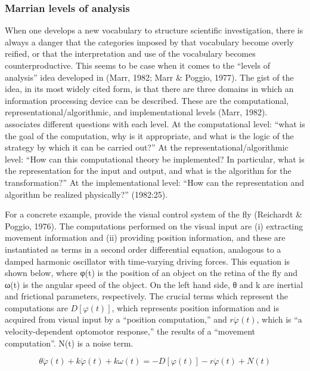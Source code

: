 \subsubsection{Marrian levels of analysis}

When one develops a new vocabulary to structure scientific investigation, there is always a danger that the categories imposed by that vocabulary become overly reified, or that the interpretation and use of the vocabulary becomes counterproductive. This seems to be case when it comes to the “levels of analysis” idea developed in (Marr, 1982; Marr \& Poggio, 1977). The gist of the idea, in its most widely cited form, is that there are three domains in which an information processing device can be described. These are the computational, representational/algorithmic, and implementational levels (Marr, 1982). \citet{Marr1982} associates different questions with each level. At the computational level: “what is the goal of the computation, why is it appropriate, and what is the logic of the strategy by which it can be carried out?” At the representational/algorithmic level: “How can this computational theory be implemented? In particular, what is the representation for the input and output, and what is the algorithm for the transformation?” At the implementational level: “How  can the representation and algorithm be realized physically?” (1982:25).

  For a concrete example, \citet{MarrPoggio1977} provide the visual control system of the fly (Reichardt \& Poggio, 1976). The computations performed on the visual input are (i) extracting movement information and (ii) providing position information, and these are instantiated as terms in a second order differential equation, analogous to a damped harmonic oscillator with time-varying driving forces. This equation is shown below, where  φ(t) is the position of an object on the retina of the fly and ω(t) is the angular speed of the object. On the left hand side, θ and k are inertial and frictional parameters, respectively. The crucial terms which represent the computations are  $D\left[\varphi \left(t\right)\right]$, which represents position information and is acquired from visual input by a “position computation,” and  $r\acute{{\varphi} }\left(t\right)$, which is “a velocity-dependent optomotor response,” the results of a “movement computation”. N(t) is a noise term.

\begin{equation*}
\theta \acute{{\varphi} }\left(t\right)+k\acute{{\varphi} }\left(t\right)+\mathit{k\omega} \left(t\right)=-D\left[\varphi \left(t\right)\right]-r\acute{{\varphi} }\left(t\right)+N\left(t\right)
\end{equation*}

